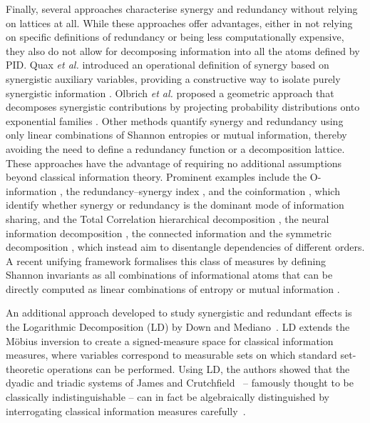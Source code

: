 \documentclass{article}
\makeatletter
\newcommand{\etal}{\textit{et al.\@} }
\makeatother
\begin{document}
Finally, several approaches characterise synergy and redundancy without relying on lattices at all. While these approaches offer advantages, either in not relying on specific definitions of redundancy or being less computationally expensive, they also do not allow for decomposing information into all the atoms defined by PID.
Quax \etal introduced an operational definition of synergy based on synergistic auxiliary variables, providing a constructive way to isolate purely synergistic information \cite{quax2017quantifying}. 
Olbrich \etal proposed a geometric approach that decomposes synergistic contributions by projecting probability distributions onto exponential families \cite{olbrich2015information}.
Other methods quantify synergy and redundancy using only linear combinations of Shannon entropies or mutual information, thereby avoiding the need to define a redundancy function or a decomposition lattice. 
These approaches have the advantage of requiring no additional assumptions beyond classical information theory. 
Prominent examples include the O-information \cite{rosas2019quantifying }, the redundancy–synergy index \cite{chechik2001group}, and the coinformation \cite{bell2003co}, which identify whether synergy or redundancy is the dominant mode of information sharing, and the Total Correlation hierarchical decomposition \cite{amari2001information}, the neural information decomposition \cite{reing2021discovering}, the connected information \cite{schneidman2003network, schneidman2003synergy, schneidman2006weak} and the symmetric decomposition \cite{rosas2016understanding}, which instead aim to disentangle dependencies of different orders. 
A recent unifying framework formalises this class of measures by defining Shannon invariants as all combinations of informational atoms that can be directly computed as linear combinations of entropy or mutual information \cite{gutknecht2025shannon}.

An additional approach developed to study synergistic and redundant effects is the Logarithmic Decomposition (LD) by Down and Mediano~\cite{down2025logarithmic,down2025algebraic}. LD extends the M\"obius inversion to create a signed-measure space for classical information measures, where variables correspond to measurable sets on which standard set-theoretic operations can be performed. Using LD, the authors showed that the dyadic and triadic systems of James and Crutchfield~\cite{james2017multivariate} -- famously thought to be classically indistinguishable -- can in fact be algebraically distinguished by interrogating classical information measures carefully~\cite{down2025logarithmic}.
\end{document}

